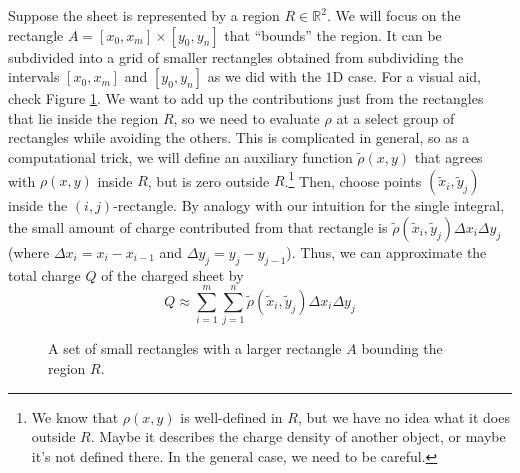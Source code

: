 Suppose the sheet is represented by a region $R \in \mathbb{R}^2$. We will focus on the rectangle $A = [x_0, x_m] \times [y_0, y_n]$ that ``bounds'' the region. It can be subdivided into a grid of smaller rectangles obtained from subdividing the intervals $[x_0, x_m]$ and $[y_0, y_n]$ as we did with the $1\text{D}$ case. For a visual aid, check Figure \ref{fig:2driemman_sum}. We want to add up the contributions just from the rectangles that lie inside the region $R$, so we need to evaluate $\rho$ at a select group of rectangles while avoiding the others. This is complicated in general, so as a computational trick, we will define an auxiliary function $\tilde{\rho}(x,y)$ that agrees with $\rho(x,y)$ inside $R$, but is zero outside $R$.\footnote{We know that $\rho(x,y)$ is well-defined in $R$, but we have no idea what it does outside $R$. Maybe it describes the charge density of another object, or maybe it's not defined there. In the general case, we need to be careful.} Then, choose points $(\tilde{x}_i, \tilde{y}_j)$ inside the $(i,j)\text{-rectangle}$. By analogy with our intuition for the single integral, the small amount of charge contributed from that rectangle is $\tilde{\rho}(\tilde{x}_i, \tilde{y}_j)\Delta x_i \Delta y_j$ (where $\Delta x_i = x_i - x_{i-1}$ and $\Delta y_j = y_j - y_{j-1}$). Thus, we can approximate the total charge $Q$ of the charged sheet by
\begin{equation}
    Q \approx \sum_{i=1}^{m} \sum_{j=1}^{n} \tilde{\rho}(\tilde{x}_i, \tilde{y}_j)\Delta x_i \Delta y_j
\end{equation}
\begin{figure}
    \centering
    \caption{A set of small rectangles with a larger rectangle $A$ bounding the region $R$. }
    \label{fig:2driemman_sum}
\end{figure}
